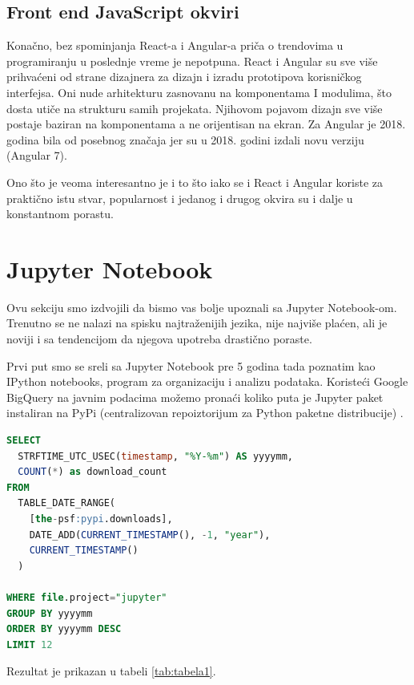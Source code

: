 \documentclass[a4paper]{article}
\begin{document}
\subsection{Front end JavaScript okviri}
\label{subsec:front end javascript okviri}

Konačno, bez spominjanja React-a i Angular-a priča o trendovima u programiranju u poslednje vreme je nepotpuna. React i Angular su sve više prihvaćeni od strane dizajnera za dizajn i izradu prototipova korisničkog interfejsa. Oni nude arhitekturu zasnovanu na komponentama I modulima, što dosta utiče na strukturu samih projekata. Njihovom pojavom dizajn sve više postaje baziran na komponentama a ne orijentisan na ekran. Za Angular je 2018. godina bila od posebnog značaja jer su u 2018. godini izdali novu verziju (Angular 7).

Ono što je veoma interesantno je i to što iako se i React i Angular koriste za praktično istu stvar, popularnost i jedanog i drugog okvira su i dalje u konstantnom porastu.

\section{Jupyter Notebook}
\label{sec:jupyter notebok}

Ovu sekciju smo izdvojili da bismo vas bolje upoznali sa Jupyter Notebook-om. Trenutno se ne nalazi na spisku najtraženijih jezika, nije najviše plaćen, ali je noviji i sa tendencijom da njegova upotreba drastično poraste.

Prvi put smo se sreli sa Jupyter Notebook pre 5 godina tada poznatim kao IPython notebooks, program za organizaciju i analizu podataka. Koristeći Google BigQuery na javnim podacima možemo pronaći koliko puta je Jupyter paket instaliran na PyPi (centralizovan repoiztorijum za Python paketne distribucije) \cite{jupyter}.

\begin{lstlisting}[caption={Broj instalacija Jupyter Python paketa na PyPi},frame=single, label=simple, language=SQL]
SELECT
  STRFTIME_UTC_USEC(timestamp, "%Y-%m") AS yyyymm,
  COUNT(*) as download_count
FROM
  TABLE_DATE_RANGE(
    [the-psf:pypi.downloads],
    DATE_ADD(CURRENT_TIMESTAMP(), -1, "year"),
    CURRENT_TIMESTAMP()
  )
 
WHERE file.project="jupyter"
GROUP BY yyyymm
ORDER BY yyyymm DESC
LIMIT 12
\end{lstlisting}

Rezultat je prikazan u tabeli \ref{tab:tabela1}.
\end{document}
